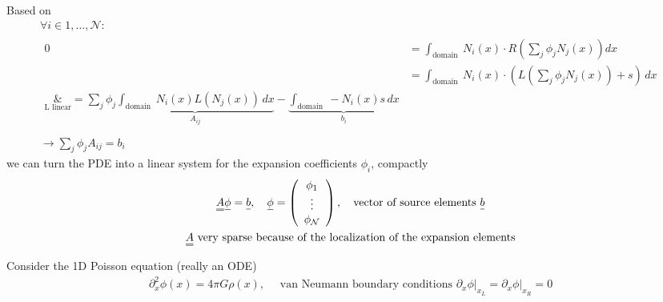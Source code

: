 Based on
\begin{equation}
    \begin{gathered}
        \forall i \in 1,\dots,\mathcal{N}: \\
        \begin{aligned}
            0 &= \int_{\text {domain }} N_i(x) \cdot R\left(\sum_j \phi_j N_j(x)\right) d x \\
              &=\int_{\text {domain }} N_i(x) \cdot \left( L\left(\sum_j \phi_j N_j(x)\right) +s \right) \, d x \\
              \underset{\text{L linear}}&= \sum_j \phi_j \underbrace{\int_{\text {domain }} N_i(x) L\left(N_j(x)\right) \, d x}_{A_{ij}}-\underbrace{\int_{\text {domain }}-N_i(x) s \, d x}_{b_i} \\
        \end{aligned} \\
        \rightarrow \sum_j \phi_j A_{ij} = b_i
    \end{gathered}
\end{equation}
we can turn the PDE into a linear system for the expansion coefficients $\phi_i$, compactly
\begin{equation}
    \begin{gathered}
        \mat{A} \vec{\phi} = \vec{b}, \quad \vec{\phi} = \left( \begin{array}{c} \phi_1 \\ \vdots \\ \phi_{\mathcal{N}}\end{array} \right), \quad \text{vector of source elements } \vec{b} \\
        \mat{A} \text{ very sparse because of the localization of the expansion elements}
    \end{gathered}
\end{equation}



Consider the 1D Poisson equation (really an ODE)
\begin{equation}
    \begin{gathered}
        \partial_x^2 \phi(x)=4 \pi G \rho(x), \quad \text { van Neumann boundary conditions }\left.\partial_x \phi\right|_{x_L}=\left.\partial_x \phi\right|_{x_R}=0
    \end{gathered}
\end{equation}

